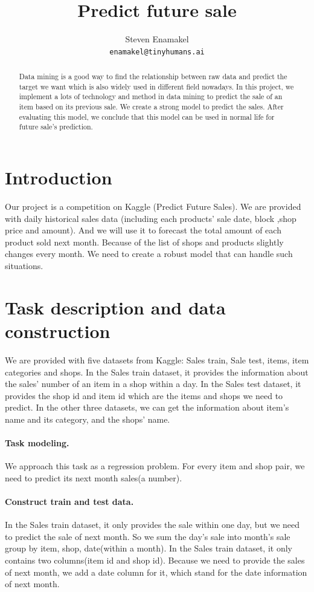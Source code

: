 \documentclass{article}
\title{Predict future sale}
\author{
 Steven Enamakel \\
  \texttt{enamakel@tinyhumans.ai} \\
}
\begin{document}
\maketitle
\begin{abstract}
Data mining is a good way to find the relationship between raw data and predict the target we want which is also widely used in different field nowadays. In this project, we implement a lots of technology and method in data mining to predict the sale of an item based on its previous sale. We create a strong model to predict the sales. After evaluating this model, we conclude that this model can be used in normal life for future sale’s prediction.
\end{abstract}




\section{Introduction}
Our project is a competition on Kaggle (Predict Future Sales). We are provided with daily historical sales data (including each products’ sale date, block ,shop price and amount). And we will use it to forecast the total amount of each product sold next month. Because of the list of shops and products slightly changes every month. We need to create a robust model that can handle such situations.


\section{Task description and data construction}
\label{sec:headings}
We are provided with five datasets from Kaggle: Sales train, Sale test, items, item categories and shops. In the Sales train dataset, it provides the information about the sales’ number of an item in a shop within a day. In the Sales test dataset, it provides the shop id and item id which are the items and shops we need to predict. In the other three datasets, we can get the information about item’s name and its category, and the shops’ name.
\paragraph{Task modeling.}
We approach this task as a regression problem. For every item and shop pair, we need to predict its next month sales(a number).
\paragraph{Construct train and test data.}
In the Sales train dataset, it only provides the sale within one day, but we need to predict the sale of next month. So we sum the day's sale into month's sale group by item, shop, date(within a month).
In the Sales train dataset, it only contains two columns(item id and shop id). Because we need to provide the sales of next month, we add a date column for it, which stand for the date information of next month.
\end{document}
